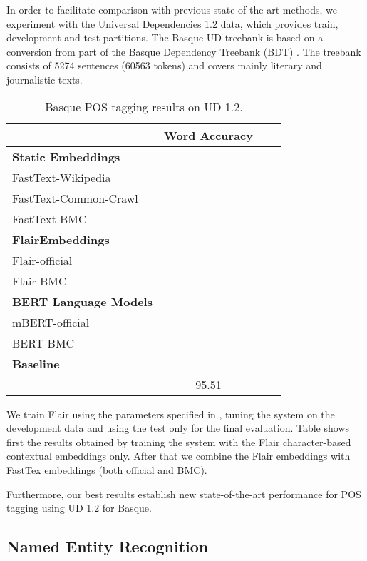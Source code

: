 \documentclass[10pt, a4paper]{article}
\begin{document}
In order to facilitate comparison with previous state-of-the-art methods, we experiment with the Universal Dependencies 1.2 data, which provides train, development and test partitions. The Basque UD treebank \cite{aranzabe2015automatic} is based on a conversion from part of the Basque Dependency Treebank (BDT) \cite{aduriz2003construction}. The treebank consists of 5274 sentences (60563 tokens) and covers mainly literary and journalistic texts.

\begin{table}[!t]\footnotesize
\centering
\begin{tabular}{@{\hspace{0.3cm}}lccc} \hline
 \textbf{} & \textbf{Word Accuracy} \\ \hline
\textbf{Static Embeddings} & \\
FastText-Wikipedia &  \\
FastText-Common-Crawl & \\
FastText-BMC  & \\ \hline
\textbf{FlairEmbeddings}\\
Flair-official &  \\
Flair-BMC  &  \\ \hline
\textbf{BERT Language Models}\\
mBERT-official  &  \\
BERT-BMC  & \\ \hline
\textbf{Baseline} \\
\cite{plank-etal-2016-multilingual} & 95.51 \\ \hline
\end{tabular}
\caption{Basque POS tagging results on UD 1.2.}\label{tab:pos}
\end{table}

We train Flair using the parameters specified in \cite{akbik2019naacl}, tuning the system on the development data and using the test only for the final evaluation.
Table shows first the results obtained by training the system with the Flair character-based contextual embeddings only. After that we combine the Flair embeddings with FastTex embeddings (both official and BMC).


Furthermore, our best results establish new state-of-the-art performance for POS tagging using UD 1.2 for Basque.


\subsection{Named Entity Recognition}\label{sec:named-entity-recogn}
\end{document}
